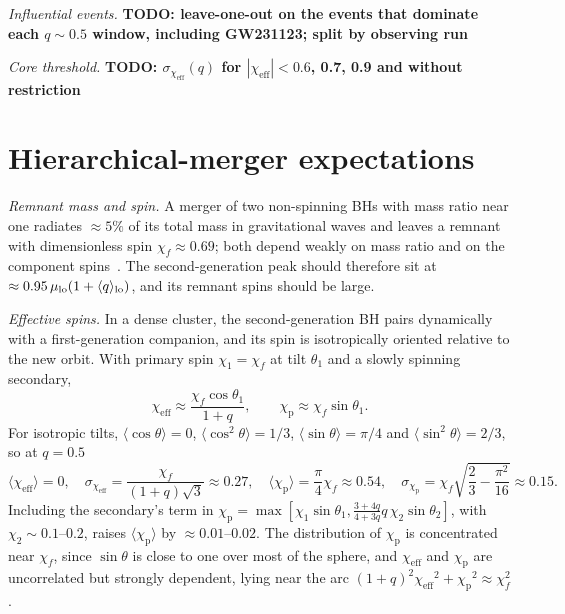 \documentclass[%
 reprint,
 amsmath,amssymb,
 aps,
 prl,
 nofootinbib,nobibnotes,
 floatfix,
]{revtex4-2}
\newcommand{\chieff}{\ensuremath{\chi_{\mathrm{eff}}}}
\newcommand{\chip}{\ensuremath{\chi_{\mathrm{p}}}}
\newcommand{\todo}[1]{{\color{Blue}\bf TODO: #1}}
\begin{document}
\textit{Influential events.} \todo{leave-one-out on the events that dominate each $q \sim 0.5$ window, including GW231123; split by observing run}

\textit{Core threshold.} \todo{$\sigma_{\chieff}(q)$ for $|\chieff| < 0.6$, 0.7, 0.9 and without restriction}

\section{Hierarchical-merger expectations}
\label{sm: hierarchical}

\textit{Remnant mass and spin.} A merger of two non-spinning \acp{BH} with mass ratio near one radiates $\approx 5\%$ of its total mass in gravitational waves and leaves a remnant with dimensionless spin $\chi_f \approx 0.69$; both depend weakly on mass ratio and on the component spins~\cite{Gerosa:2021mno}. The second-generation peak should therefore sit at $\approx 0.95\,\mu_{\rm lo}(1 + \langle q \rangle_{\rm lo})$, and its remnant spins should be large.

\textit{Effective spins.} In a dense cluster, the second-generation \ac{BH} pairs dynamically with a first-generation companion, and its spin is isotropically oriented relative to the new orbit. With primary spin $\chi_1 = \chi_f$ at tilt $\theta_1$ and a slowly spinning secondary,
\begin{equation}
    \chieff \approx \frac{\chi_f \cos\theta_1}{1 + q}, \qquad \chip \approx \chi_f \sin\theta_1.
\end{equation}
For isotropic tilts, $\langle\cos\theta\rangle = 0$, $\langle\cos^2\theta\rangle = 1/3$, $\langle\sin\theta\rangle = \pi/4$ and $\langle\sin^2\theta\rangle = 2/3$, so at $q = 0.5$
\begin{equation}
    \langle\chieff\rangle = 0, \quad \sigma_{\chieff} = \frac{\chi_f}{(1+q)\sqrt{3}} \approx 0.27, \quad \langle\chip\rangle = \frac{\pi}{4}\chi_f \approx 0.54, \quad \sigma_{\chip} = \chi_f\sqrt{\frac{2}{3} - \frac{\pi^2}{16}} \approx 0.15.
\end{equation}
Including the secondary's term in $\chip = \max[\chi_1\sin\theta_1, \frac{3 + 4q}{4 + 3q} q\, \chi_2\sin\theta_2]$, with $\chi_2 \sim 0.1$--$0.2$, raises $\langle\chip\rangle$ by $\approx 0.01$--$0.02$. The distribution of $\chip$ is concentrated near $\chi_f$, since $\sin\theta$ is close to one over most of the sphere, and $\chieff$ and $\chip$ are uncorrelated but strongly dependent, lying near the arc $(1+q)^2\chieff^2 + \chip^2 \approx \chi_f^2$.
\end{document}
